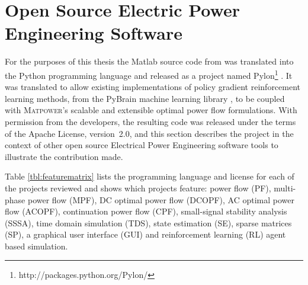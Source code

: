 \chapter{Open Source Electric Power Engineering Software}
\label{sec:oss}
For the purposes of this thesis the Matlab source code from \matpower was
translated into the Python programming language and released as a project named
Pylon\footnote{http://packages.python.org/Pylon/} \cite{lincoln:pyreto}. It was
translated to allow existing implementations of policy gradient reinforcement
learning methods, from the PyBrain machine learning library \cite{schaul:2010},
to be coupled with \textsc{Matpower}'s scalable and extensible optimal power
flow formulations. With permission from the \matpower developers, the resulting
code was released under the terms of the Apache License, version~2.0, and this
section describes the project in the context of other open source Electrical
Power Engineering software tools to illustrate the contribution made.

Table \ref{tbl:featurematrix} lists the programming language and license
for each of the projects reviewed and shows which projects feature: power
flow (PF), multi-phase power flow (MPF), DC optimal power flow (DCOPF), AC optimal
power flow (ACOPF), continuation power flow (CPF), small-signal stability
analysis (SSSA), time domain simulation (TDS), state estimation (SE), sparse
matrices (SP), a graphical user interface (GUI) and reinforcement learning
(RL) agent based simulation.

